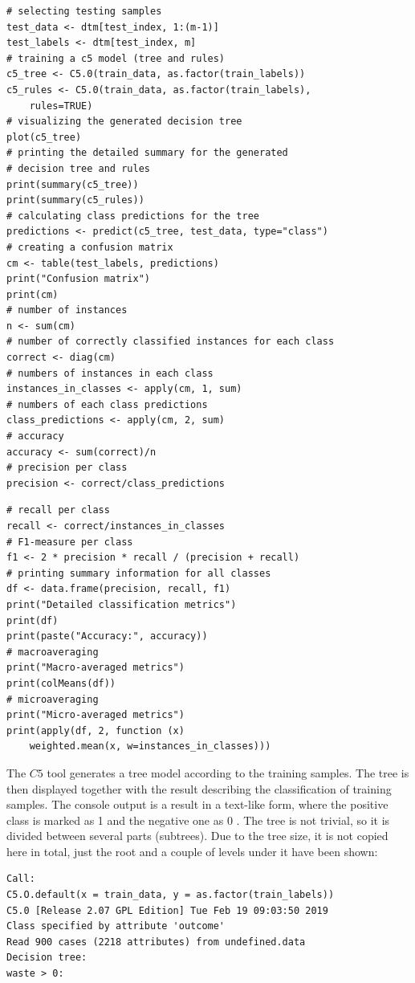 \documentclass[10pt]{book}
\begin{document}
\begin{verbatim}
# selecting testing samples
test_data <- dtm[test_index, 1:(m-1)]
test_labels <- dtm[test_index, m]
# training a c5 model (tree and rules)
c5_tree <- C5.0(train_data, as.factor(train_labels))
c5_rules <- C5.0(train_data, as.factor(train_labels),
    rules=TRUE)
# visualizing the generated decision tree
plot(c5_tree)
# printing the detailed summary for the generated
# decision tree and rules
print(summary(c5_tree))
print(summary(c5_rules))
# calculating class predictions for the tree
predictions <- predict(c5_tree, test_data, type="class")
# creating a confusion matrix
cm <- table(test_labels, predictions)
print("Confusion matrix")
print(cm)
# number of instances
n <- sum(cm)
# number of correctly classified instances for each class
correct <- diag(cm)
# numbers of instances in each class
instances_in_classes <- apply(cm, 1, sum)
# numbers of each class predictions
class_predictions <- apply(cm, 2, sum)
# accuracy
accuracy <- sum(correct)/n
# precision per class
precision <- correct/class_predictions
\end{verbatim}

\begin{verbatim}
# recall per class
recall <- correct/instances_in_classes
# F1-measure per class
f1 <- 2 * precision * recall / (precision + recall)
# printing summary information for all classes
df <- data.frame(precision, recall, f1)
print("Detailed classification metrics")
print(df)
print(paste("Accuracy:", accuracy))
# macroaveraging
print("Macro-averaged metrics")
print(colMeans(df))
# microaveraging
print("Micro-averaged metrics")
print(apply(df, 2, function (x)
    weighted.mean(x, w=instances_in_classes)))
\end{verbatim}

The $C 5$ tool generates a tree model according to the training samples. The tree is then displayed together with the result describing the classification of training samples. The console output is a result in a text-like form, where the positive class is marked as 1 and the negative one as 0 . The tree is not trivial, so it is divided between several parts (subtrees). Due to the tree size, it is not copied here in total, just the root and a couple of levels under it have been shown:

\begin{verbatim}
Call:
C5.O.default(x = train_data, y = as.factor(train_labels))
C5.0 [Release 2.07 GPL Edition] Tue Feb 19 09:03:50 2019
Class specified by attribute 'outcome'
Read 900 cases (2218 attributes) from undefined.data
Decision tree:
waste > 0:
\end{verbatim}
\end{document}
